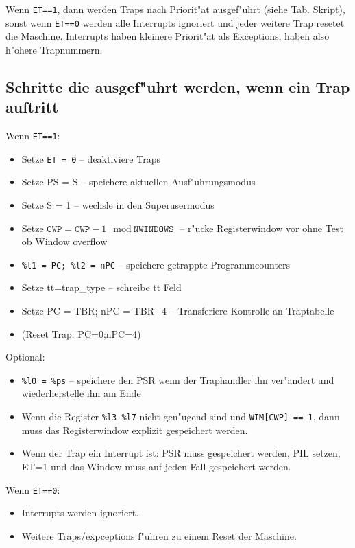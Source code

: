 \documentclass[german, 10pt, a4paper, twocolumn]{scrartcl}
\begin{document}
Wenn \texttt{ET==1}, dann werden Traps nach Priorit"at ausgef"uhrt (siehe Tab. Skript), sonst wenn \texttt{ET==0} werden alle Interrupts ignoriert und jeder weitere Trap resetet die Maschine. Interrupts haben kleinere Priorit"at als Exceptions, haben also h"ohere Trapnummern.\\

\subsection{Schritte die ausgef"uhrt werden, wenn ein Trap auftritt}

Wenn \texttt{ET==1}:
\begin{itemize}
	\item Setze \texttt{ET = 0} -- deaktiviere Traps
	\item Setze PS = S -- speichere aktuellen Ausf"uhrungsmodus
	\item Setze S = 1 -- wechsle in den Superusermodus
	\item Setze $\texttt{CWP} = \texttt{CWP}-1 \mod \texttt{NWINDOWS}$ -- r"ucke Registerwindow vor ohne Test ob Window overflow
	\item \verb#%l1 = PC; %l2 = nPC# -- speichere getrappte Programmcounters
	\item Setze tt=trap\_type -- schreibe tt Feld
	\item Setze PC = TBR; nPC = TBR+4 -- Transferiere Kontrolle an Traptabelle
	\item (Reset Trap: PC=0;nPC=4)
\end{itemize}

Optional:
\begin{itemize}
	\item \verb#%l0 = %ps# -- speichere den PSR wenn der Traphandler ihn ver"andert und wiederherstelle ihn am Ende
	\item Wenn die Register \verb#%l3-%l7# nicht gen"ugend sind und \verb#WIM[CWP] == 1#, dann muss das Registerwindow explizit gespeichert werden.
	\item Wenn der Trap ein Interrupt ist: PSR muss gespeichert werden, PIL setzen, ET=1 und das Window muss auf jeden Fall gespeichert werden.
\end{itemize}

Wenn \texttt{ET==0}:
\begin{itemize}
	\item Interrupts werden ignoriert.
	\item Weitere Traps/expceptions f"uhren zu einem Reset der Maschine.
\end{itemize}
\end{document}
